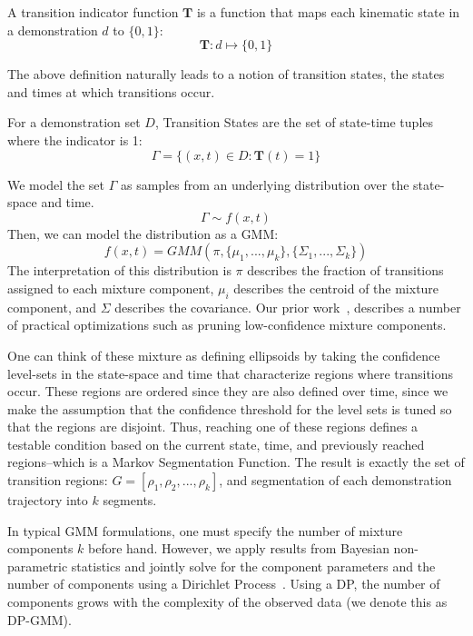 \begin{definition}
A transition indicator function $\mathbf{T}$ is a function that maps each kinematic state in a demonstration $d$ to $\{0,1\}$:
\[
\mathbf{T}: d \mapsto \{0,1\}
\]
\end{definition}

The above definition naturally leads to a notion of transition states, the states and times at which transitions occur.

\begin{definition}
For a demonstration set $D$, Transition States are the set of state-time tuples where the indicator is 1:
\[
\Gamma = \{(x,t) \in D : \mathbf{T}(t) = 1\}
\]
\end{definition}

We model the set $\Gamma$ as samples from an underlying distribution over the state-space and time.
\[
\Gamma \sim f(x,t)
\]
Then, we can model the distribution as a GMM:
\[
f(x,t) = GMM(\pi,\{\mu_1,...,\mu_k\}, \{\Sigma_1,...,\Sigma_k\})
\]
The interpretation of this distribution is $\pi$ describes the fraction of transitions assigned to each mixture component, $\mu_i$ describes the centroid of the mixture component, and $\Sigma$ describes the covariance.
Our prior work~\cite{krishnan2015tsc,murali2016}, describes a number of practical optimizations such as pruning low-confidence mixture components.

One can think of these mixture as defining ellipsoids by taking the confidence level-sets in the state-space and time that characterize regions where transitions occur.
These regions are ordered since they are also defined over time, since we make the assumption that the confidence threshold for the level sets is tuned so that the regions are disjoint.
Thus, reaching one of these regions defines a testable condition based on the current state, time, and previously reached regions--which is a Markov Segmentation Function.
The result is exactly the set of transition regions: $G = [\rho_1, \rho_2,...,\rho_k]$, and segmentation of each demonstration trajectory into $k$ segments.

In typical GMM formulations, one must specify the number of mixture components $k$ before hand.
However, we apply results from Bayesian non-parametric statistics and jointly solve for the component parameters and the number of components using a Dirichlet Process~\cite{kulis2011revisiting}.
Using a DP, the number of components grows with the complexity of the observed data (we denote this as DP-GMM).

